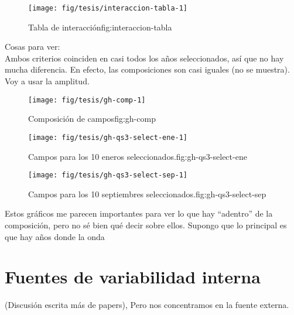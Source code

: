 \documentclass[spanish,a4paper]{book}
\begin{document}
\begin{figure}

{\centering \texttt{[image: fig/tesis/interaccion-tabla-1]} 

}

\caption{Tabla de interacción{fig:interaccion-tabla}}\label{fig:interaccion-tabla}
\end{figure}

Cosas para ver:\\
Ambos criterios coinciden en casi todos los años seleccionados, así que
no hay mucha diferencia. En efecto, las composiciones son casi iguales
(no se muestra). Voy a usar la amplitud.

\begin{figure}

{\centering \texttt{[image: fig/tesis/gh-comp-1]} 

}

\caption{Composición de campos{fig:gh-comp}}\label{fig:gh-comp}
\end{figure}

\begin{figure}

{\centering \texttt{[image: fig/tesis/gh-qs3-select-ene-1]} 

}

\caption{Campos para los 10 eneros seleccionados.{fig:gh-qs3-select-ene}}\label{fig:gh-qs3-select-ene}
\end{figure}

\begin{figure}

{\centering \texttt{[image: fig/tesis/gh-qs3-select-sep-1]} 

}

\caption{Campos para los 10 septiembres seleccionados.{fig:gh-qs3-select-sep}}\label{fig:gh-qs3-select-sep}
\end{figure}

Estos gráficos me parecen importantes para ver lo que hay ``adentro'' de
la composición, pero no sé bien qué decir sobre ellos. Supongo que lo
principal es que hay años donde la onda

\section{Fuentes de variabilidad
interna}\label{fuentes-de-variabilidad-interna}

(Discusión escrita más de papers), Pero nos concentramos en la fuente
externa.
\end{document}
